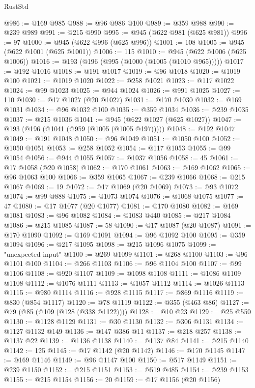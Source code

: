 \begin{lexlean}{RustStd}
\begin{coremodule}
@986 := @169 @985
@988 := @96 @986 @100
@989 := @359 @988
@990 := @239 @989
@991 := @215 @990
@995 := @945 (@622 @981 (@625 @981))
@996 := 97
@1000 := @945 (@622 @996 (@625 @996))
@1001 := 108
@1005 := @945 (@622 @1001 (@625 @1001))
@1006 := 115
@1010 := @945 (@622 @1006 (@625 @1006))
@1016 := @193 (@196 (@995 (@1000 (@1005 (@1010 @965)))))
@1017 := @192 @1016
@1018 := @191 @1017
@1019 := @96 @1018
@1020 := @1019 @100
@1021 := @1019 @1020
@1022 := @258 @1021
@1023 := @117 @1022
@1024 := @99 @1023
@1025 := @944 @1024
@1026 := @991 @1025
@1027 := 110
@1030 := @17 @1027 (@20 @1027)
@1031 := @170 @1030
@1032 := @169 @1031
@1034 := @96 @1032 @100
@1035 := @359 @1034
@1036 := @239 @1035
@1037 := @215 @1036
@1041 := @945 (@622 @1027 (@625 @1027))
@1047 := @193 (@196 (@1041 (@959 (@1005 (@1005 @197)))))
@1048 := @192 @1047
@1049 := @191 @1048
@1050 := @96 @1049
@1051 := @1050 @100
@1052 := @1050 @1051
@1053 := @258 @1052
@1054 := @117 @1053
@1055 := @99 @1054
@1056 := @944 @1055
@1057 := @1037 @1056
@1058 := 45
@1061 := @17 @1058 (@20 @1058)
@1062 := @170 @1061
@1063 := @169 @1062
@1065 := @96 @1063 @100
@1066 := @359 @1065
@1067 := @239 @1066
@1068 := @215 @1067
@1069 := 19
@1072 := @17 @1069 (@20 @1069)
@1073 := @93 @1072
@1074 := @99 @888
@1075 := @1073 @1074
@1076 := @1068 @1075
@1077 := 47
@1080 := @17 @1077 (@20 @1077)
@1081 := @170 @1080
@1082 := @169 @1081
@1083 := @96 @1082
@1084 := @1083 @440
@1085 := @217 @1084
@1086 := @215 @1085
@1087 := 58
@1090 := @17 @1087 (@20 @1087)
@1091 := @170 @1090
@1092 := @169 @1091
@1094 := @96 @1092 @100
@1095 := @359 @1094
@1096 := @217 @1095
@1098 := @215 @1096 @1075
@1099 := "unexpected input"
@1100 := @269 @1099
@1101 := @268 @1100
@1103 := @96 @1101 @100
@1104 := @266 @1103
@1106 := @96 @1104 @100
@1107 := @99 @1106
@1108 := @920 @1107
@1109 := @1098 @1108
@1111 := @1086 @1109 @1108
@1112 := @1076 @1111
@1113 := @1057 @1112
@1114 := @1026 @1113
@1115 := @980 @1114
@1116 := @928 @1115
@1117 := @869 @1116
@1119 := @830 (@854 @1117)
@1120 := @78 @1119
@1122 := @355 (@463 @86)
@1127 := @79 (@85 (@109 (@128 (@338 @1122))))
@1128 := @10 @23
@1129 := @25 @550
@1130 := @1128 @1129
@1131 := @30 @1130
@1132 := @306 @1131
@1134 := @1127 @1132 @149
@1136 := @147 @386 @11
@1137 := @218 @257
@1138 := @1137 @22
@1139 := @1136 @1138
@1140 := @1137 @84
@1141 := @215 @1140
@1142 := 125
@1145 := @17 @1142 (@20 @1142)
@1146 := @170 @1145
@1147 := @169 @1146
@1149 := @96 @1147 @100
@1150 := @517 @1149
@1151 := @239 @1150
@1152 := @215 @1151
@1153 := @519 @485
@1154 := @239 @1153
@1155 := @215 @1154
@1156 := 20
@1159 := @17 @1156 (@20 @1156)

\end{coremodule}
\end{lexlean}
